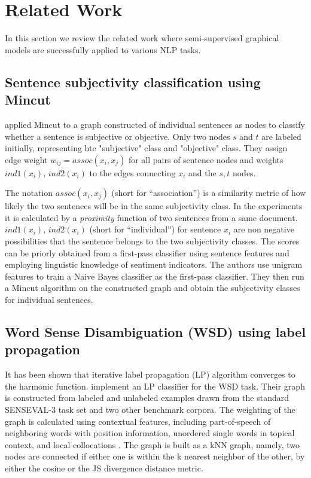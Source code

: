 \section{Related Work}

In this section we review the related work where semi-supervised graphical
models are successfully applied to various NLP tasks.

\subsection*{Sentence subjectivity classification using Mincut}

\cite{pang04} applied Mincut to a graph constructed of individual
sentences as nodes to classify whether a sentence is subjective or objective.  
Only two nodes $s$ and $t$ are labeled initially, representing hte "subjective"
class and "objective" class. They assign edge weight $w_{ij} = assoc(x_i,
x_j)$ for all pairs of sentence nodes   
and weights $ind1(x_i)$, $ind2(x_i)$ to the edges connecting $x_i$ and the $s,    
t$ nodes.\par 

The notation $assoc(x_i, x_j)$ (short for ``association'') is a similarity
metric of how likely the two sentences will be in the same         
subjectivity class. In the experiments it is calculated by a                                        
\emph{proximity} function of two sentences from a same document.
$ind1(x_i)$,  $ind2(x_i)$ (short for ``individual'') for sentence $x_i$ are
non negative possibilities that the sentence belongs to  
the two subjectivity classes. 
The scores can be priorly obtained from
a first-pass classifier using sentence features and employing linguistic
knowledge of sentiment indicators. The authors use unigram features to train a
Naive Bayes classifier as the first-pass classifier.
They then run a Mincut algorithm on the constructed graph and obtain the
subjectivity classes for individual sentences. 


\subsection*{Word Sense Disambiguation (WSD) using label propagation}

 It has been shown that iterative label propagation (LP) algorithm converges to
 the harmonic function. \cite{niu05} implement an LP classifier for
 the WSD task. Their graph is constructed from labeled and unlabeled examples
 drawn from the standard SENSEVAL-3 task set and two other benchmark corpora. 
  The weighting of the graph is calculated using 
  contextual features, including part-of-speech of neighboring
  words with position information, unordered single words in topical context,
  and local collocations \cite{niu05}. 
  The graph is built as a kNN graph, namely, two nodes are connected if either
  one is within the k nearest neighbor of the other, by either the cosine or 
  the JS divergence distance metric.
 
